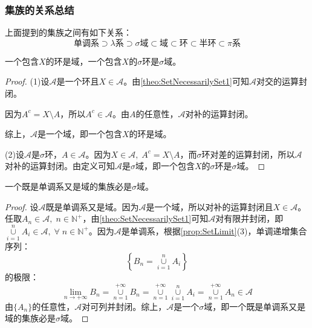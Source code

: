 \subsubsection{集族的关系总结}
上面提到的集族之间有如下关系：
\begin{equation*}
	\text{单调系}\supset\text{$\lambda$系}\supset\text{$\sigma$域}\subset\text{域}\subset\text{环}\subset\text{半环}\subset\text{$\pi$系}
\end{equation*}
\begin{theorem}\label{theo:RingContainX=Field}
	一个包含$X$的环是域，一个包含$X$的$\sigma$环是$\sigma$域。
\end{theorem}
\begin{proof}
	(1)设$\mathscr{A}$是一个环且$X\in\mathscr{A}$。由\cref{theo:SetNecessarilySet1}可知$\mathscr{A}$对交的运算封闭。\par
	因为$A^c=X\setminus A$，所以$A^c\in\mathscr{A}$。由$A$的任意性，$\mathscr{A}$对补的运算封闭。\par
	综上，$\mathscr{A}$是一个域，即一个包含$X$的环是域。\par
	(2)设$\mathscr{A}$是$\sigma$环，$A\in\mathscr{A}$。因为$X\in\mathscr{A},\;A^c=X\setminus A$，而$\sigma$环对差的运算封闭，所以$\mathscr{A}$对补的运算封闭。由定义可知$\mathscr{A}$是$\sigma$域，即一个包含$X$的$\sigma$环是$\sigma$域。
\end{proof}
\begin{theorem}\label{theo:Monotone+Field=SigmaField}
	一个既是单调系又是域的集族必是$\sigma$域。
\end{theorem}
\begin{proof}
	设$\mathscr{A}$既是单调系又是域。因为$\mathscr{A}$是一个域，所以对补的运算封闭且$X\in\mathscr{A}$。任取$A_n\in\mathscr{A},\;n\in\mathbb{N}^+$，由\cref{theo:SetNecessarilySet1}可知$\mathscr{A}$对有限并封闭，即$\underset{i=1}{\overset{n}{\cup}}A_i\in\mathscr{A},\;\forall\;n\in\mathbb{N}^+$。因为$\mathscr{A}$是单调系，根据\cref{prop:SetLimit}(3)，单调递增集合序列：
	\begin{equation*}
		\left\{B_n=\underset{i=1}{\overset{n}{\cup}}A_i\right\}
	\end{equation*}
	的极限：
	\begin{equation*}
		\lim_{n\to+\infty}B_n=\underset{n=1}{\overset{+\infty}{\cup}}B_n=\underset{n=1}{\overset{+\infty}{\cup}}\underset{i=1}{\overset{n}{\cup}}A_i=\underset{n=1}{\overset{+\infty}{\cup}}A_n\in\mathscr{A}
	\end{equation*}
	由$\{A_n\}$的任意性，$\mathscr{A}$对可列并封闭。综上，$\mathscr{A}$是一个$\sigma$域，即一个既是单调系又是域的集族必是$\sigma$域。
\end{proof}
